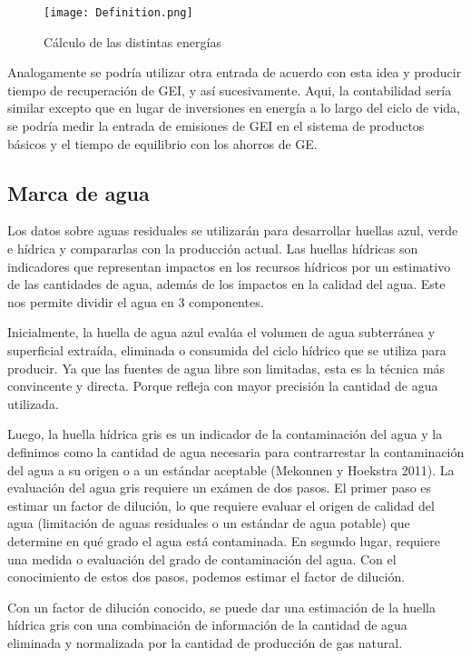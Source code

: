 \documentclass[runningheads]{llncs}
\begin{document}
\begin{figure}[htbp] %
  \texttt{[image: Definition.png]}
 \caption{Cálculo de las distintas energías}
 \label{Definition}
\end{figure}

\bigskip
Analogamente se podría utilizar otra entrada de acuerdo con esta idea y producir tiempo de recuperación de GEI, y así sucesivamente. Aqui, la contabilidad sería similar excepto que en lugar de inversiones en energía a lo largo del ciclo de vida, se podría medir la entrada de emisiones de GEI en el sistema de productos básicos y el tiempo de equilibrio con los ahorros de GE.

\subsection{Marca de agua}
\bigskip
Los datos sobre aguas residuales se utilizarán para desarrollar huellas azul, verde e hídrica y compararlas con la producción actual. Las huellas hídricas son indicadores que representan impactos en los recursos hídricos por un estimativo de las cantidades de agua, además de los impactos en la calidad del agua. Este nos permite dividir el agua en 3 componentes.

\bigskip
 Inicialmente, la huella de agua azul evalúa el volumen de agua subterránea y superficial extraída, eliminada o consumida del ciclo hídrico que se utiliza para producir. Ya que las fuentes de agua libre son limitadas, esta es la técnica más convincente y directa. Porque refleja con mayor precisión la cantidad de agua utilizada.
 
 \bigskip
 Luego, la huella hídrica gris es un indicador de la contaminación del agua y la definimos como la cantidad de agua necesaria para contrarrestar la contaminación del agua a su origen o a un estándar aceptable (Mekonnen y Hoekstra 2011). La evaluación del agua gris requiere un exámen de dos pasos. El primer paso es estimar un factor de dilución, lo que requiere evaluar el origen de calidad del agua (limitación de aguas residuales o un estándar de agua potable) que determine en qué grado el agua está contaminada. En segundo lugar, requiere una medida o evaluación del grado de contaminación del agua. Con el conocimiento de estos dos pasos, podemos estimar el factor de dilución.


\bigskip
Con un factor de dilución conocido, se puede dar una estimación de la huella hídrica gris con una combinación de información de la cantidad de agua eliminada y normalizada por la cantidad de producción de gas natural.
 
\end{document}
